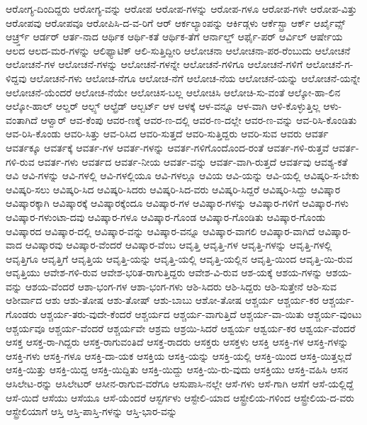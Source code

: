 {ಆರೋಗ್ಯ-ದಿಂದಿದ್ದರು
ಆರೋಗ್ಯ-ವನ್ನು
ಆರೋಪ
ಆರೋಪ-ಗಳನ್ನು
ಆರೋಪ-ಗಳೂ
ಆರೋಪ-ಗಳೇ
ಆರೋಪ-ವಿತ್ತು
ಆರೋಪವು
ಆರೋಪವೂ
ಆರೋಪಿಸಿ-ದ-ವ-ರಿಗೆ
ಆರ್
ಆರ್ಕಲ್ಯಾಂಪನ್ನು
ಆರ್ಕಿಡ್ಗಳು
ಆರ್ಕೆಸ್ಟ್ರಾ
ಆರ್ಕ್
ಆರ್ಖೈವ್ಸ್
ಆರ್ಚ್ರ್ಡ್
ಆರ್ಡರ್
ಆರ್ತ-ನಾದ
ಆರ್ಥಿಕ
ಆರ್ಥಿ-ಕತೆ
ಆರ್ಥಿಕ-ತೆಗೆ
ಆರ್ನಾಲ್ಡ್
ಆರ್ಫೈ-ಪರ್
ಆರ್ವಿಲ್
ಆರ್ಷೇಯ
ಆಲದ
ಆಲದ-ಮರ-ಗಳನ್ನು
ಆಲಿಫ್ಯಾಟಿಕ್
ಆಲಿ-ಸುತ್ತಿದ್ದೀರಿ
ಆಲೋಚನಾ
ಆಲೋಚನಾ-ಪರ-ರೆಂಬುದು
ಆಲೋಚನೆ
ಆಲೋಚನೆ-ಗಳ
ಆಲೋಚನೆ-ಗಳನ್ನು
ಆಲೋಚನೆ-ಗಳನ್ನೇ
ಆಲೋಚನೆ-ಗಳಿಗೂ
ಆಲೋಚನೆ-ಗಳಿಗೆ
ಆಲೋಚನೆ-ಗ-ಳಿದ್ದವು
ಆಲೋಚನೆ-ಗಳು
ಆಲೋಚ-ನೆಗೂ
ಆಲೋಚ-ನೆಗೆ
ಆಲೋಚ-ನೆಯ
ಆಲೋಚನೆ-ಯನ್ನು
ಆಲೋಚನೆ-ಯನ್ನೇ
ಆಲೋಚನೆ-ಯೆಂದರೆ
ಆಲೋಚ-ನೆಯೇ
ಆಲೋಚಿಸ-ಬಲ್ಲ
ಆಲೋಚಿಸಿ
ಆಲೋಚಿ-ಸು-ವಂತೆ
ಆಲ್ಕೋ-ಹಾ-ಲಿನ
ಆಲ್ಕೋ-ಹಾಲ್
ಆಲ್ಡರ್
ಆಲ್ಪ್ಸ್
ಆಲ್ಫ್ರೆಡ್
ಆಲ್ಬರ್ಟ್
ಆಳ
ಆಳಕ್ಕೆ
ಆಳ-ವನ್ನೂ
ಆಳ-ವಾಗಿ
ಆಳಿ-ಕೊಳ್ಳುತ್ತಿಲ್ಲ
ಆಳು-ವಂತಾಗಿದೆ
ಆಳ್ವಾರ್
ಆವ-ಕೆಂಪು
ಆವರ-ಣಕ್ಕೆ
ಆವರ-ಣ-ದಲ್ಲಿ
ಆವರ-ಣ-ದಲ್ಲೇ
ಆವರ-ಣ-ವನ್ನು
ಆವ-ರಿಸಿ-ಕೊಂಡಿತು
ಆವ-ರಿಸಿ-ಕೊಂಡು
ಆವರಿ-ಸಿತ್ತು
ಆವ-ರಿಸಿದ
ಆವರಿ-ಸುತ್ತದೆ
ಆವರಿ-ಸುತ್ತಿದ್ದರು
ಆವರಿ-ಸುವ
ಆವರು
ಆವರ್ತ
ಆವರ್ತಕ್ಕೂ
ಆವರ್ತಕ್ಕೆ
ಆವರ್ತ-ಗಳ
ಆವರ್ತ-ಗಳನ್ನು
ಆವರ್ತ-ಗಳಿಗೊಂದೊಂದ-ರಂತೆ
ಆವರ್ತ-ಗಳಿ-ರುತ್ತವೆ
ಆವರ್ತ-ಗಳಿ-ರುವ
ಆವರ್ತ-ಗಳು
ಆವರ್ತದ
ಆವರ್ತ-ನೀಯ
ಆವರ್ತ-ವನ್ನು
ಆವರ್ತ-ವಾಗಿ-ರುತ್ತದೆ
ಆವರ್ತವು
ಆವಶ್ಯ-ಕತೆ
ಆವಿ
ಆವಿ-ಗಳನ್ನು
ಆವಿ-ಗಳಲ್ಲಿ
ಆವಿ-ಗಳಲ್ಲಿಯೂ
ಆವಿ-ಗಳಲ್ಲೂ
ಆವಿಯ
ಆವಿ-ಯನ್ನು
ಆವಿ-ಯಲ್ಲಿ
ಆವಿಷ್ಕರಿ-ಸ-ಬೇಕು
ಆವಿಷ್ಕರಿ-ಸಲು
ಆವಿಷ್ಕರಿ-ಸಿದ
ಆವಿಷ್ಕರಿ-ಸಿದರು
ಆವಿಷ್ಕರಿ-ಸಿದ-ವರು
ಆವಿಷ್ಕರಿ-ಸಿದ್ದರೆ
ಆವಿಷ್ಕರಿ-ಸಿದ್ದು
ಆವಿಷ್ಕಾರ
ಆವಿಷ್ಕಾರಕ್ಕಾಗಿ
ಆವಿಷ್ಕಾರಕ್ಕೆ
ಆವಿಷ್ಕಾರಕ್ಕೆಂದೂ
ಆವಿಷ್ಕಾರ-ಗಳ
ಆವಿಷ್ಕಾರ-ಗಳನ್ನು
ಆವಿಷ್ಕಾರ-ಗಳಿಗೆ
ಆವಿಷ್ಕಾರ-ಗಳು
ಆವಿಷ್ಕಾರ-ಗಳುಂಟಾ-ದವು
ಆವಿಷ್ಕಾರ-ಗಳೂ
ಆವಿಷ್ಕಾರ-ಗೊಂಡ
ಆವಿಷ್ಕಾರ-ಗೊಂಡಿತು
ಆವಿಷ್ಕಾರ-ಗೊಂಡು
ಆವಿಷ್ಕಾರದ
ಆವಿಷ್ಕಾರ-ದಲ್ಲಿ
ಆವಿಷ್ಕಾರ-ವನ್ನು
ಆವಿಷ್ಕಾರ-ವನ್ನೂ
ಆವಿಷ್ಕಾರ-ವಾಗಲಿ
ಆವಿಷ್ಕಾರ-ವಾಗಿದೆ
ಆವಿಷ್ಕಾರ-ವಾದ
ಆವಿಷ್ಕಾರವು
ಆವಿಷ್ಕಾರ-ವೆಂದರೆ
ಆವಿಷ್ಕಾರ-ವೆಂಬ
ಆವೃತ್ತಿ
ಆವೃತ್ತಿ-ಗಳ
ಆವೃತ್ತಿ-ಗಳನ್ನು
ಆವೃತ್ತಿ-ಗಳಲ್ಲಿ
ಆವೃತ್ತಿಗೂ
ಆವೃತ್ತಿಗೆ
ಆವೃತ್ತಿಯ
ಆವೃತ್ತಿ-ಯನ್ನು
ಆವೃತ್ತಿ-ಯಲ್ಲಿ
ಆವೃತ್ತಿ-ಯಲ್ಲಿನ
ಆವೃತ್ತಿ-ಯಿಂದ
ಆವೃತ್ತಿ-ಯಿ-ರುವ
ಆವೃತ್ತಿಯು
ಆವೇಶ-ಗಳಿ-ರುವ
ಆವೇಶ-ಭರಿತ-ರಾಗುತ್ತಿದ್ದರು
ಆವೇಶ-ವಿ-ರುವ
ಆಶ-ಯಕ್ಕೆ
ಆಶಯ-ಗಳನ್ನು
ಆಶಯ-ವನ್ನು
ಆಶಯ-ವೆಂದರೆ
ಆಶಾ-ಭಂಗ-ಗಳ
ಆಶಾ-ಭಂಗ-ಗಳು
ಆಶಿ-ಸಿದರು
ಆಶಿ-ಸಿದ್ದರು
ಆಶಿ-ಸುತ್ತೇನೆ
ಆಶಿ-ಸುವ
ಆಶೀರ್ವಾದ
ಆಶು
ಆಶು-ತೋಷ
ಆಶು-ತೋಷ್
ಆಶು-ಬಾಬು
ಆಶೋ-ತೋಷ
ಆಶ್ಚರ್ಯ
ಆಶ್ಚರ್ಯ-ಕರ
ಆಶ್ಚರ್ಯ-ಗೊಂಡರು
ಆಶ್ಚರ್ಯ-ತರು-ವುದೇ-ಕೆಂದರೆ
ಆಶ್ಚರ್ಯದ
ಆಶ್ಚರ್ಯ-ವಾಗುತ್ತಿದೆ
ಆಶ್ಚರ್ಯ-ವಾ-ಯಿತು
ಆಶ್ಚರ್ಯ-ವುಂಟು
ಆಶ್ಚರ್ಯವೂ
ಆಶ್ಚರ್ಯ-ವೆಂದರೆ
ಆಶ್ಚರ್ಯವೇ
ಆಶ್ರಮ
ಆಶ್ರಯಿ-ಸಿದರೆ
ಆಶ್ವರ್ಯ
ಆಶ್ವರ್ಯ-ಕರ
ಆಶ್ವರ್ಯ-ವೆಂದರೆ
ಆಸಕ್ತ
ಆಸಕ್ತ-ರಾ-ಗಿದ್ದರು
ಆಸಕ್ತ-ರಾಗುವಂತಿದೆ
ಆಸಕ್ತ-ರಾದರು
ಆಸಕ್ತರು
ಆಸಕ್ತಳು
ಆಸಕ್ತಿ
ಆಸಕ್ತಿ-ಗಳ
ಆಸಕ್ತಿ-ಗಳನ್ನು
ಆಸಕ್ತಿ-ಗಳು
ಆಸಕ್ತಿ-ಗಳೂ
ಆಸಕ್ತಿ-ದಾ-ಯಕ
ಆಸಕ್ತಿಯ
ಆಸಕ್ತಿ-ಯನ್ನು
ಆಸಕ್ತಿ-ಯಲ್ಲಿ
ಆಸಕ್ತಿ-ಯಿಂದ
ಆಸಕ್ತಿ-ಯಿತ್ತಲ್ಲದೆ
ಆಸಕ್ತಿ-ಯಿತ್ತು
ಆಸಕ್ತಿ-ಯಿದ್ದ
ಆಸಕ್ತಿ-ಯಿದ್ದಿತು
ಆಸಕ್ತಿ-ಯಿದ್ದು
ಆಸಕ್ತಿ-ಯಿ-ರು-ವುದು
ಆಸಕ್ತಿಯು
ಆಸಕ್ತಿ-ವಹಿಸಿ
ಆಸನ
ಆಸಿಲೇಟ-ರನ್ನು
ಆಸಿಲೇಟರ್
ಆಸೀನ-ರಾಗುವ-ವರೆಗೂ
ಆಸುಪಾಸಿ-ನಲ್ಲೇ
ಆಸೆ-ಗಳು
ಆಸೆ-ಗಾಗಿ
ಆಸೆಗೆ
ಆಸೆ-ಯಲ್ಲಿದ್ದೆ
ಆಸೆ-ಯಿದೆ
ಆಸೆಯು
ಆಸೆಯೂ
ಆಸೆ-ಯೆಂದರೆ
ಆಸ್ಟರ್ಗಳು
ಆಸ್ಟೇಲಿ-ಯಾದ
ಆಸ್ಟ್ರೇಲಿಯ-ಗಳಿಂದ
ಆಸ್ಟ್ರೇಲಿಯ-ದ-ವರು
ಆಸ್ಟ್ರೇಲಿಯಾಗೆ
ಆಸ್ತಿ
ಆಸ್ತಿ-ಪಾಸ್ತಿ-ಗಳನ್ನು
ಆಸ್ತಿ-ಭಾರ-ವನ್ನು
}
